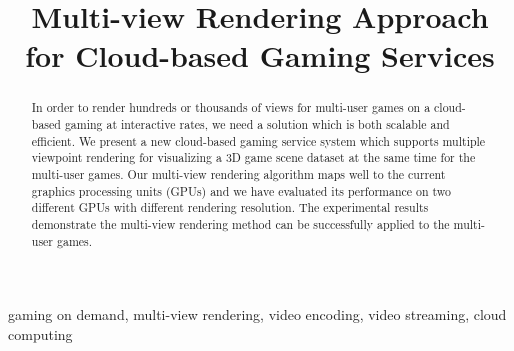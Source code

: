 \documentclass[conference]{IEEEtran}
\begin{document}
    \title{Multi-view Rendering Approach for Cloud-based Gaming Services}

    \author{
    }

    \maketitle

    \begin{abstract}
    In order to render hundreds or thousands of views for multi-user games on a cloud-based gaming at interactive rates, we need a solution which is both scalable and efficient.
    We present a new cloud-based gaming service system which supports
    multiple viewpoint rendering for visualizing a 3D game scene dataset at the same time for the multi-user games.
    Our multi-view rendering algorithm maps well to the current graphics processing units (GPUs) and we have evaluated its performance on two different GPUs with different rendering resolution.
    The experimental results demonstrate the multi-view rendering method can be successfully applied to the multi-user games.
    \end{abstract}

    \begin{IEEEkeywords}
    gaming on demand, multi-view rendering, video encoding, video streaming, cloud computing
    \end{IEEEkeywords}

    \IEEEpeerreviewmaketitle
\end{document}
